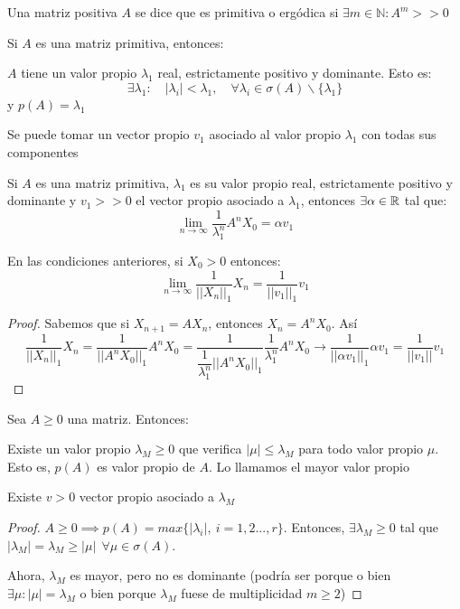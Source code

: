 \begin{ndef}
	Una matriz positiva $A$ se dice que es primitiva o ergódica si $\exists m\in \mathbb N : A^m >> 0$
\end{ndef}

\begin{nth}
	Si $A$ es una matriz primitiva, entonces:
	\begin{nlist}
	\item $A$ tiene un valor propio $\lambda_1$ real, estrictamente positivo y dominante. Esto es:
	\[
	\exists \lambda_1 : \quad |\lambda_i| < \lambda_1, \quad \forall \lambda_i \in \sigma(A)\backslash \{\lambda_1\}
	\]
	y $p(A) = \lambda_1$
	\item Se puede tomar un vector propio $v_1$ asociado al valor propio $\lambda_1$ con todas sus componentes
\end{nlist}
\end{nth}

\begin{ncor}
	Si $A$ es una matriz primitiva, $\lambda_1$ es su valor propio real, estrictamente positivo y dominante y $v_1 >> 0$ el vector propio asociado a $\lambda_1$, entonces $\exists \alpha \in \mathbb{R} $ tal que:
	\[
	\lim_{n\to \infty} \frac{1}{\lambda_1^n} A^n X_0 = \alpha v_1
	\]
\end{ncor}
\begin{ncor}
	En las condiciones anteriores, si $X_0 > 0$ entonces:
	\[
	\lim_{n\to \infty} \dfrac{1}{||X_n||_1}X_n = \frac{1}{||v_1||_1}v_1
	\]
\end{ncor}
\begin{proof}
Sabemos que si $X _{n+1} = AX_n$, entonces $X_n = A^n X_0$. Así
	  \[
	  \dfrac{1}{||X_n||_1}X_n = \dfrac{1}{||A^n X_0||_1}A^n X_0 =  \dfrac{1}{\dfrac{1}{\lambda_1^n}||A^n X_0||_1}\dfrac{1}{\lambda_1^n}A^n X_0 \to \dfrac{1}{||\alpha v_1||_1}\alpha v_1 = \dfrac{1}{||v_1||}v_1
	  \]
\end{proof}

\begin{nprop}
	Sea $A \geq 0$ una matriz. Entonces:
	\begin{nlist}
	\item Existe un valor propio $\lambda_M \geq 0$ que verifica $|\mu| \leq \lambda_M$ para todo valor propio $\mu$. Esto es, $p(A)$ es valor propio de $A$. Lo llamamos el mayor valor propio
	\item Existe $v>0$ vector propio asociado a $\lambda_M$
\end{nlist}
\end{nprop}
\begin{proof}
	$A \geq 0 \implies p(A) = max\{|\lambda_i|, \ i= 1,2...,r\}$. Entonces, $\exists \lambda_M \geq 0$ tal que $|\lambda_M| = \lambda_M \geq |\mu| \ \ \forall \mu \in \sigma(A)$.

	Ahora, $\lambda_M$ es mayor, pero no es dominante (podría ser porque o bien $\exists \mu : |\mu|=\lambda_M$ o bien porque $\lambda_M$ fuese de multiplicidad $m\geq 2$)
\end{proof}

